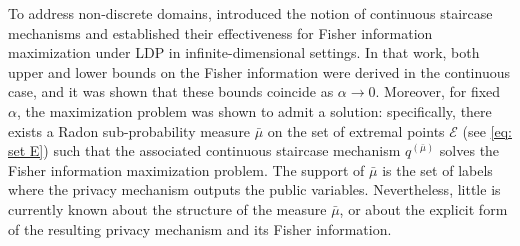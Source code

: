 \documentclass[a4paper, 11pt]{article}
\theoremstyle{definition}
\newcommand{\modar}{\color{black}}
\begin{document}
{To address non-discrete domains, \cite{amorino2025factorization} introduced the notion of continuous staircase mechanisms and established their effectiveness for Fisher information maximization under LDP in infinite-dimensional settings. In that work, both upper and lower bounds on the Fisher information were derived in the continuous case, and it was shown that these bounds coincide as \( \alpha \to 0 \). Moreover, for fixed \( \alpha \), the maximization problem was shown to admit a solution: specifically, there exists a Radon sub-probability measure \( \bar{\mu} \) on the set of extremal points \( \mathcal{E} \) (see \eqref{eq: set E}) such that the associated continuous staircase mechanism \( q^{(\bar{\mu})} \) solves the Fisher information maximization problem.
{\modar The support of $\bar{\mu}$ is the set of labels where the privacy mechanism outputs the public variables.} Nevertheless, little is currently known about the structure of the measure \( \bar{\mu} \), or about the explicit form of the resulting privacy mechanism and its Fisher information.


}
\end{document}
